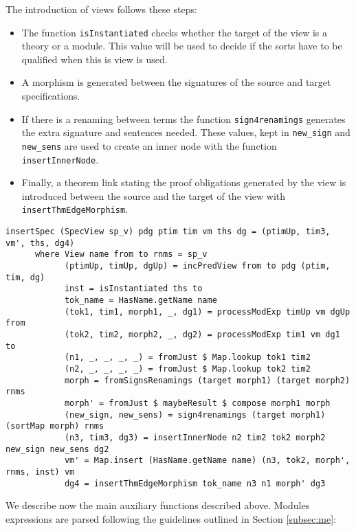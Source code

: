 The introduction of views follows these steps:

\begin{itemize}
\item The function \verb"isInstantiated" checks whether the target of the
view is a theory or a module. This value will be used to decide if the
sorts have to be qualified when this is view is used.
\item A morphism is generated between the signatures of the source and
target specifications.
\item If there is a renaming between terms the function \verb"sign4renamings"
generates the extra signature and sentences needed. These values, kept in
\verb"new_sign" and \verb"new_sens" are used to create an inner node with
the function \verb"insertInnerNode".
\item Finally, a theorem link stating the proof obligations generated by
the view is introduced between the source and the target of the view with
\verb"insertThmEdgeMorphism".
\end{itemize}

{\codesize
\begin{verbatim}
insertSpec (SpecView sp_v) pdg ptim tim vm ths dg = (ptimUp, tim3, vm', ths, dg4)
      where View name from to rnms = sp_v
            (ptimUp, timUp, dgUp) = incPredView from to pdg (ptim, tim, dg)
            inst = isInstantiated ths to
            tok_name = HasName.getName name
            (tok1, tim1, morph1, _, dg1) = processModExp timUp vm dgUp from
            (tok2, tim2, morph2, _, dg2) = processModExp tim1 vm dg1 to
            (n1, _, _, _, _) = fromJust $ Map.lookup tok1 tim2
            (n2, _, _, _, _) = fromJust $ Map.lookup tok2 tim2
            morph = fromSignsRenamings (target morph1) (target morph2) rnms
            morph' = fromJust $ maybeResult $ compose morph1 morph
            (new_sign, new_sens) = sign4renamings (target morph1) (sortMap morph) rnms
            (n3, tim3, dg3) = insertInnerNode n2 tim2 tok2 morph2 new_sign new_sens dg2
            vm' = Map.insert (HasName.getName name) (n3, tok2, morph', rnms, inst) vm
            dg4 = insertThmEdgeMorphism tok_name n3 n1 morph' dg3
\end{verbatim}
}

We describe now the main auxiliary functions described above.
Modules expressions are parsed following the guidelines outlined in
Section \ref{subsec:me}:

